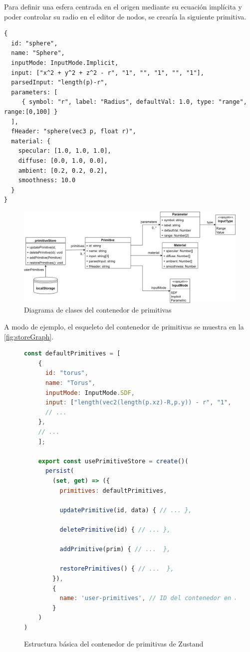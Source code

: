 \begin{ejemplo}
Para definir una esfera centrada en el origen mediante su ecuación implícita y poder controlar su radio en el editor de nodos, se crearía la siguiente primitiva.
\begin{lstlisting}
{
  id: "sphere",
  name: "Sphere",
  inputMode: InputMode.Implicit,
  input: ["x^2 + y^2 + z^2 - r", "1", "", "1", "", "1"],
  parsedInput: "length(p)-r",
  parameters: [
     { symbol: "r", label: "Radius", defaultVal: 1.0, type: "range", range:[0,100] }
  ],
  fHeader: "sphere(vec3 p, float r)",
  material: {
    specular: [1.0, 1.0, 1.0],
    diffuse: [0.0, 1.0, 0.0],
    ambient: [0.2, 0.2, 0.2],
    smoothness: 10.0
  }
}
\end{lstlisting}
\end{ejemplo}

\begin{figure}[ht!]
    \centering
    \includegraphics[width=\textwidth]{Plantilla-TFG-master/img/diagramaZustand.png}
    \caption{Diagrama de clases del contenedor de primitivas}
    \label{fig:contenedorPrim}
\end{figure}

A modo de ejemplo, el esqueleto del contenedor de primitivas se muestra en la \autoref{fig:storeGraph}.
\begin{figure}[ht!]
    \centering
    \begin{lstlisting}[language=JavaScript]
    const defaultPrimitives = [
    {
      id: "torus",
      name: "Torus",
      inputMode: InputMode.SDF,
      input: ["length(vec2(length(p.xz)-R,p.y)) - r", "1", "","1","","1"],
      // ...
    },
    // ...
    ];

    export const usePrimitiveStore = create()(
      persist(
        (set, get) => ({
          primitives: defaultPrimitives,
          
          updatePrimitive(id, data) { // ... },
        
          deletePrimitive(id) { // ... },
        
          addPrimitive(prim) { // ...  },
        
          restorePrimitives() { // ...  },
        }),
        {
          name: 'user-primitives', // ID del contenedor en almacenamiento local
        }
    )
)
    \end{lstlisting}
    \caption{Estructura básica del contenedor de primitivas de Zustand}
    \label{fig:storeGraph}
\end{figure}

